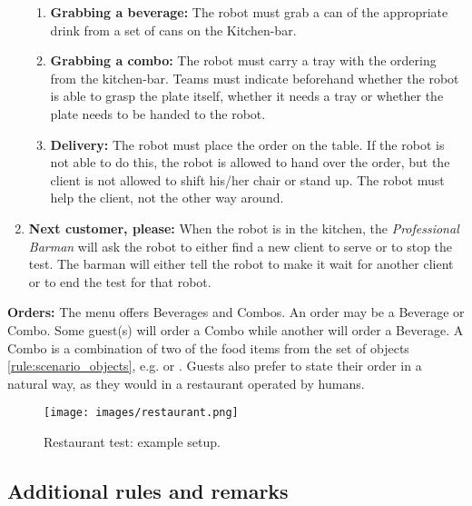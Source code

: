 \begin{enumerate}
\begin{enumerate}
		\item \textbf{Grabbing a beverage:} The robot must grab a can of the appropriate drink from a set of cans on the Kitchen-bar. 

		\item \textbf{Grabbing a combo:}  The robot must carry a tray with the ordering from the kitchen-bar. 
		Teams must indicate beforehand whether the robot is able to grasp the plate itself, whether it needs a tray or whether the plate needs to be handed to the robot.
		
		\item \textbf{Delivery:} The robot must place the order on the table. 
		If the robot is not able to do this, the robot is allowed to hand over the order, but the client is not allowed to shift his/her chair or stand up. 
		The robot must help the client, not the other way around. 
	\end{enumerate}
	
	\item \textbf{Next customer, please:} When the robot is in the kitchen, the \textit{Professional Barman} will ask the robot to either find a new client to serve or to stop the test.
	The barman will either tell the robot  to make it wait for another client or  to end the test for that robot. 
\end{enumerate}

\textbf{Orders:} The menu offers Beverages and Combos. An order may be a Beverage or Combo. Some guest(s) will order a Combo while another will order a Beverage.
  A Combo is a combination of two of the food items from the set of objects \ref{rule:scenario_objects}, e.g.  or . 
  Guests also prefer to state their order in a natural way, as they would in a restaurant operated by humans.
  
\begin{figure}[tbp]
	\centering
	\texttt{[image: images/restaurant.png]}
	\caption{Restaurant test: example setup.}
	\label{fig:restaurant}
\end{figure}

\subsection{Additional rules and remarks}

